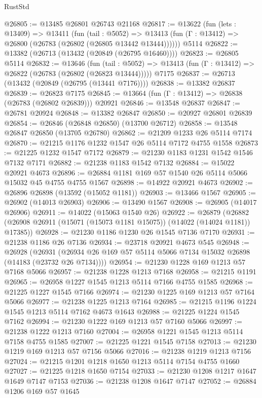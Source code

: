\begin{lexlean}{RustStd}
\begin{coremodule}
@26805 := @13485 @26801 @26743 @21168
@26817 := @13622
    (fun (lets : @13409) =>
    @13411
      (fun (tail : @5052) =>
      @13413 (fun (Γ : @13412) => @26800 (@26783 (@26802 (@26805 @13442 @13444))))))
    @5114
@26822 := @13382 (@26713 (@13432 (@20849 (@26795 @16460))))
@26823 := @26805 @5114
@26832 := @13646
    (fun (tail : @5052) => @13413 (fun (Γ : @13412) => @26822 (@26783 (@26802 (@26823 @13444)))))
    @7175
@26837 := @26713 (@13432 (@20849 (@26795 (@13441 @7176))))
@26838 := @13382 @26837
@26839 := @26823 @7175
@26845 := @13664 (fun (Γ : @13412) => @26838 (@26783 (@26802 @26839))) @20921
@26846 := @13548 @26837
@26847 := @26781 @20924
@26848 := @13382 @26847
@26850 := @20927 @26801 @26839
@26854 := @26846 (@26848 @26850) (@13700 @26712)
@26858 := @13548 @26847 @26850 (@13705 @26780)
@26862 := @21209 @1233 @26 @5114 @7174
@26870 := @21215 @1176 @1232 @1547 @26 @5114 @7172 @4755 @1558
@26873 := @21225 @1232 @1547 @7172
@26879 := @21230 @1183 @1231 @1542 @1546 @7132 @7171
@26882 := @21238 @1183 @1542 @7132
@26884 := @15022 @20921 @4673
@26896 := @26884 @1181 @169 @57 @1540 @26 @5114 @5066 @15032 @45 @4755 @4755 @1567
@26898 := @14922 @20921 @4673
@26902 := @26896 @26898 (@13592 (@15052 @1181))
@26903 := @13466 @1567
@26905 := @26902 (@14013 @26903)
@26906 := @13490 @1567
@26908 := @26905 (@14017 @26906)
@26911 := @14022 (@15063 @1540 @26)
@26922 := @26879
    (@26882 (@26908 @26911 (@15071 (@15073 @1181 @15075)) (@14022 (@14024 @1181)) @17385))
@26928 := @21230 @1186 @1230 @26 @1545 @7136 @7170
@26931 := @21238 @1186 @26 @7136
@26934 := @23718 @20921 @4673 @545
@26948 := @26928
    (@26931 (@26934 @26 @169 @57 @5114 @5066 @7134 @15032 @26898 (@14183 (@23732 @26 @7134))))
@26954 := @21230 @1228 @169 @1213 @57 @7168 @5066
@26957 := @21238 @1228 @1213 @7168
@26958 := @21215 @1191
@26965 := @26958 @1227 @1545 @1213 @5114 @7166 @4755 @1585
@26968 := @21225 @1227 @1545 @7166
@26974 := @21230 @1225 @169 @1213 @57 @7164 @5066
@26977 := @21238 @1225 @1213 @7164
@26985 := @21215 @1196 @1224 @1545 @1213 @5114 @7162 @4673 @1643
@26988 := @21225 @1224 @1545 @7162
@26994 := @21230 @1222 @169 @1213 @57 @7160 @5066
@26997 := @21238 @1222 @1213 @7160
@27004 := @26958 @1221 @1545 @1213 @5114 @7158 @4755 @1585
@27007 := @21225 @1221 @1545 @7158
@27013 := @21230 @1219 @169 @1213 @57 @7156 @5066
@27016 := @21238 @1219 @1213 @7156
@27024 := @21215 @1201 @1218 @1650 @1213 @5114 @7154 @4755 @1660
@27027 := @21225 @1218 @1650 @7154
@27033 := @21230 @1208 @1217 @1647 @1649 @7147 @7153
@27036 := @21238 @1208 @1647 @7147
@27052 := @26884
    @1206
    @169
    @57
    @1645

\end{coremodule}
\end{lexlean}
